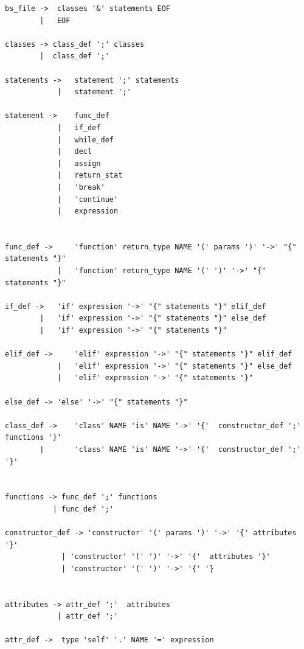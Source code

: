 \begin{verbatim}
bs_file ->  classes '&' statements EOF     
        |   EOF                       

classes -> class_def ';' classes         
        |  class_def ';'                       

statements ->   statement ';' statements      
            |   statement ';'                      

statement ->    func_def
            |   if_def
            |   while_def
            |   decl 
            |   assign 
            |   return_stat 
            |   'break'                            
            |   'continue'                         
            |   expression


func_def ->     'function' return_type NAME '(' params ')' '->' "{" statements "}"       
            |   'function' return_type NAME '(' ')' '->' "{" statements "}"              

if_def ->   'if' expression '->' "{" statements "}" elif_def                             
        |   'if' expression '->' "{" statements "}" else_def                             
        |   'if' expression '->' "{" statements "}"                                      

elif_def ->     'elif' expression '->' "{" statements "}" elif_def                       
            |   'elif' expression '->' "{" statements "}" else_def                       
            |   'elif' expression '->' "{" statements "}"                                

else_def -> 'else' '->' "{" statements "}"                                               

class_def ->    'class' NAME 'is' NAME '->' '{'  constructor_def ';' functions '}'   
        |       'class' NAME 'is' NAME '->' '{'  constructor_def ';' '}'                     


functions -> func_def ';' functions                     
           | func_def ';'                               

constructor_def -> 'constructor' '(' params ')' '->' '{' attributes '}'              
             | 'constructor' '(' ')' '->' '{'  attributes '}'                 
             | 'constructor' '(' ')' '->' '{' '}                        


attributes -> attr_def ';'  attributes             
            | attr_def ';'                        

attr_def ->  type 'self' '.' NAME '=' expression           



\end{verbatim}
